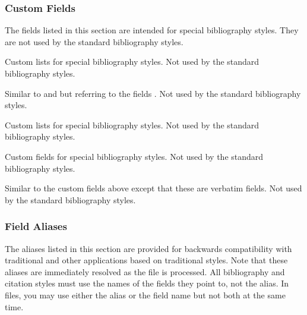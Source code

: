 \documentclass{ltxdockit}[2011/03/25]
\begin{document}
\subsubsection{Custom Fields}
\label{bib:fld:ctm}

The fields listed in this section are intended for special bibliography styles. They are not used by the standard bibliography styles.

\begin{fieldlist}


Custom lists for special bibliography styles. Not used by the standard bibliography styles.


Similar to  and  but referring to the fields . Not used by the standard bibliography styles.


Custom lists for special bibliography styles. Not used by the standard bibliography styles.


Custom fields for special bibliography styles. Not used by the standard bibliography styles.


Similar to the custom fields above except that these are verbatim fields. Not used by the standard bibliography styles.

\end{fieldlist}

\subsubsection{Field Aliases}
\label{bib:fld:als}

The aliases listed in this section are provided for backwards compatibility with traditional \bibtex and other applications based on traditional \bibtex styles. Note that these aliases are immediately resolved as the  file is processed. All bibliography and citation styles must use the names of the fields they point to, not the alias. In  files, you may use either the alias or the field name but not both at the same time.
\end{document}

